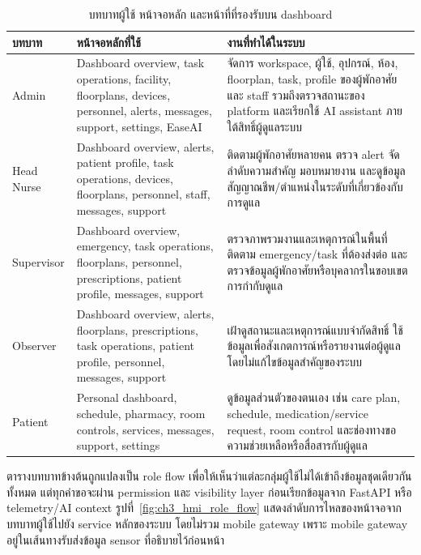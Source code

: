 \begin{table}[H]
    \centering
    \caption{บทบาทผู้ใช้ หน้าจอหลัก และหน้าที่ที่รองรับบน dashboard}
    \label{tab:ch3_hmi_role_flow}
    \small
    \renewcommand{\arraystretch}{1.2}
    \begin{tabular}{|L{2.4cm}|L{4.4cm}|L{5.8cm}|}
        \hline
        \textbf{บทบาท} & \textbf{หน้าจอหลักที่ใช้} & \textbf{งานที่ทำได้ในระบบ} \\ \hline
        Admin & Dashboard overview, task operations, facility, floorplans, devices, personnel, alerts, messages, support, settings, EaseAI & จัดการ workspace, ผู้ใช้, อุปกรณ์, ห้อง, floorplan, task, profile ของผู้พักอาศัยและ staff รวมถึงตรวจสถานะของ platform และเรียกใช้ AI assistant ภายใต้สิทธิ์ผู้ดูแลระบบ \\ \hline
        Head Nurse & Dashboard overview, alerts, patient profile, task operations, devices, floorplans, personnel, staff, messages, support & ติดตามผู้พักอาศัยหลายคน ตรวจ alert จัดลำดับความสำคัญ มอบหมายงาน และดูข้อมูลสัญญาณชีพ/ตำแหน่งในระดับที่เกี่ยวข้องกับการดูแล \\ \hline
        Supervisor & Dashboard overview, emergency, task operations, floorplans, personnel, prescriptions, patient profile, messages, support & ตรวจภาพรวมงานและเหตุการณ์ในพื้นที่ ติดตาม emergency/task ที่ต้องส่งต่อ และตรวจข้อมูลผู้พักอาศัยหรือบุคลากรในขอบเขตการกำกับดูแล \\ \hline
        Observer & Dashboard overview, alerts, floorplans, prescriptions, task operations, patient profile, personnel, messages, support & เฝ้าดูสถานะและเหตุการณ์แบบจำกัดสิทธิ์ ใช้ข้อมูลเพื่อสังเกตการณ์หรือรายงานต่อผู้ดูแล โดยไม่แก้ไขข้อมูลสำคัญของระบบ \\ \hline
        Patient & Personal dashboard, schedule, pharmacy, room controls, services, messages, support, settings & ดูข้อมูลส่วนตัวของตนเอง เช่น care plan, schedule, medication/service request, room control และช่องทางขอความช่วยเหลือหรือสื่อสารกับผู้ดูแล \\ \hline
    \end{tabular}
\end{table}

ตารางบทบาทข้างต้นถูกแปลงเป็น role flow เพื่อให้เห็นว่าแต่ละกลุ่มผู้ใช้ไม่ได้เข้าถึงข้อมูลชุดเดียวกันทั้งหมด แต่ทุกคำขอจะผ่าน permission และ visibility layer ก่อนเรียกข้อมูลจาก FastAPI หรือ telemetry/AI context รูปที่~\ref{fig:ch3_hmi_role_flow} แสดงลำดับการไหลของหน้าจอจากบทบาทผู้ใช้ไปยัง service หลักของระบบ โดยไม่รวม mobile gateway เพราะ mobile gateway อยู่ในเส้นทางรับส่งข้อมูล sensor ที่อธิบายไว้ก่อนหน้า

